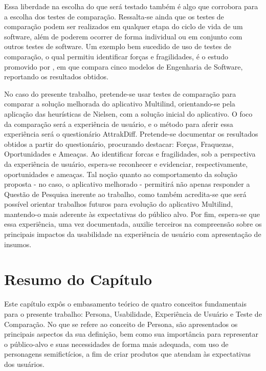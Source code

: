 Essa liberdade na escolha do que será testado também é algo que corrobora para a escolha dos testes de comparação. Ressalta-se ainda que os testes de comparação podem ser realizados em qualquer etapa 
do ciclo de vida de um software, além de poderem ocorrer de forma individual ou em conjunto com outros testes de software. Um exemplo bem sucedido de uso de testes de comparação, o qual permitiu identificar 
forças e fragilidades, é o estudo promovido por , em que compara cinco modelos de Engenharia de Software, reportando os resultados obtidos. 

No caso do presente trabalho, pretende-se usar testes de comparação para comparar a solução melhorada do aplicativo Multilind, orientando-se pela aplicação das heurísticas de Nielsen, com a solução inicial 
do aplicativo. O foco da comparação será a experiência de usuário, e o método para aferir essa experiência será o questionário AttrakDiff. Pretende-se documentar os resultados obtidos a partir do questionário, 
procurando destacar: Forças, Fraquezas, Oportunidades e Ameaças. Ao identificar forcas e fragilidades, sob a perspectiva da experiência de usuário, espera-se reconhecer e evidenciar, respectivamente, oportunidades 
e ameaças. Tal noção quanto ao comportamento da solução proposta - no caso, o aplicativo melhorado - permitirá não apenas responder a Questão de Pesquisa inerente ao trabalho, como também acredita-se que será 
possível orientar trabalhos futuros para evolução do aplicativo Multilind, mantendo-o mais aderente às expectativas do público alvo. Por fim, espera-se que essa experiência, uma vez documentada, auxilie terceiros 
na compreensão sobre os principais impactos da usabilidade na experiência de usuário com apresentação de insumos.


\section{Resumo do Capítulo}
\label{sec:Resumo do Capítulo}

Este capítulo expôs o embasamento teórico de quatro conceitos fundamentais para o presente trabalho: Persona, Usabilidade, Experiência de Usuário e Teste de Comparação. No que se 
refere ao conceito de Persona, são apresentados os principais aspectos da sua definição, bem como sua importância para representar o público-alvo e suas necessidades de forma mais adequada, 
com uso de personagens semifictícios, a fim de criar produtos que atendam às expectativas dos usuários. 


